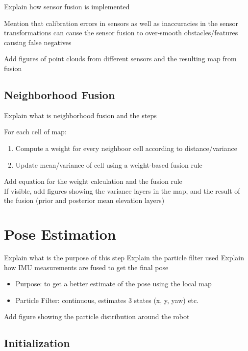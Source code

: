 Explain how sensor fusion is implemented

\noindent
Mention that calibration errors in sensors as well as inaccuracies in the sensor transformations can cause the sensor fusion to over-smooth obstacles/features causing false negatives

\noindent
Add figures of point clouds from different sensors and the resulting map from fusion

\subsection{Neighborhood Fusion}

Explain what is neighborhood fusion and the steps

\bigskip
\noindent
For each cell of map:
\begin{enumerate}
    \item Compute a weight for every neighboor cell according to distance/variance
    \item Update mean/variance of cell using a weight-based fusion rule
\end{enumerate}

\noindent
Add equation for the weight calculation and the fusion rule\\
If visible, add figures showing the variance layers in the map, and the result of the fusion (prior and posterior mean elevation layers)

\section{Pose Estimation}

Explain what is the purpose of this step
Explain the particle filter used
Explain how IMU measurements are fused to get the final pose

\begin{itemize}
    \item Purpose: to get a better estimate of the pose using the local map
    \item Particle Filter: continuous, estimates 3 states (x, y, yaw) etc.
\end{itemize}

\noindent
Add figure showing the particle distribution around the robot

\subsection{Initialization}

